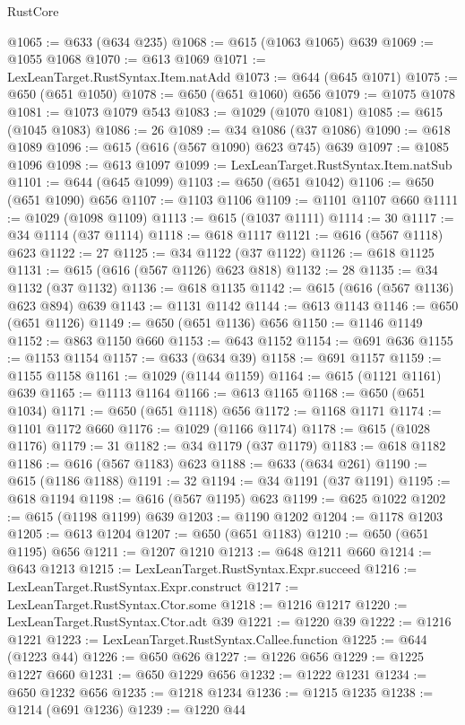 \begin{lexlean}{RustCore}
\begin{coremodule}
@1065 := @633 (@634 @235)
@1068 := @615 (@1063 @1065) @639
@1069 := @1055 @1068
@1070 := @613 @1069
@1071 := LexLeanTarget.RustSyntax.Item.natAdd
@1073 := @644 (@645 @1071)
@1075 := @650 (@651 @1050)
@1078 := @650 (@651 @1060) @656
@1079 := @1075 @1078
@1081 := @1073 @1079 @543
@1083 := @1029 (@1070 @1081)
@1085 := @615 (@1045 @1083)
@1086 := 26
@1089 := @34 @1086 (@37 @1086)
@1090 := @618 @1089
@1096 := @615 (@616 (@567 @1090) @623 @745) @639
@1097 := @1085 @1096
@1098 := @613 @1097
@1099 := LexLeanTarget.RustSyntax.Item.natSub
@1101 := @644 (@645 @1099)
@1103 := @650 (@651 @1042)
@1106 := @650 (@651 @1090) @656
@1107 := @1103 @1106
@1109 := @1101 @1107 @660
@1111 := @1029 (@1098 @1109)
@1113 := @615 (@1037 @1111)
@1114 := 30
@1117 := @34 @1114 (@37 @1114)
@1118 := @618 @1117
@1121 := @616 (@567 @1118) @623
@1122 := 27
@1125 := @34 @1122 (@37 @1122)
@1126 := @618 @1125
@1131 := @615 (@616 (@567 @1126) @623 @818)
@1132 := 28
@1135 := @34 @1132 (@37 @1132)
@1136 := @618 @1135
@1142 := @615 (@616 (@567 @1136) @623 @894) @639
@1143 := @1131 @1142
@1144 := @613 @1143
@1146 := @650 (@651 @1126)
@1149 := @650 (@651 @1136) @656
@1150 := @1146 @1149
@1152 := @863 @1150 @660
@1153 := @643 @1152
@1154 := @691 @636
@1155 := @1153 @1154
@1157 := @633 (@634 @39)
@1158 := @691 @1157
@1159 := @1155 @1158
@1161 := @1029 (@1144 @1159)
@1164 := @615 (@1121 @1161) @639
@1165 := @1113 @1164
@1166 := @613 @1165
@1168 := @650 (@651 @1034)
@1171 := @650 (@651 @1118) @656
@1172 := @1168 @1171
@1174 := @1101 @1172 @660
@1176 := @1029 (@1166 @1174)
@1178 := @615 (@1028 @1176)
@1179 := 31
@1182 := @34 @1179 (@37 @1179)
@1183 := @618 @1182
@1186 := @616 (@567 @1183) @623
@1188 := @633 (@634 @261)
@1190 := @615 (@1186 @1188)
@1191 := 32
@1194 := @34 @1191 (@37 @1191)
@1195 := @618 @1194
@1198 := @616 (@567 @1195) @623
@1199 := @625 @1022
@1202 := @615 (@1198 @1199) @639
@1203 := @1190 @1202
@1204 := @1178 @1203
@1205 := @613 @1204
@1207 := @650 (@651 @1183)
@1210 := @650 (@651 @1195) @656
@1211 := @1207 @1210
@1213 := @648 @1211 @660
@1214 := @643 @1213
@1215 := LexLeanTarget.RustSyntax.Expr.succeed
@1216 := LexLeanTarget.RustSyntax.Expr.construct
@1217 := LexLeanTarget.RustSyntax.Ctor.some
@1218 := @1216 @1217
@1220 := LexLeanTarget.RustSyntax.Ctor.adt @39
@1221 := @1220 @39
@1222 := @1216 @1221
@1223 := LexLeanTarget.RustSyntax.Callee.function
@1225 := @644 (@1223 @44)
@1226 := @650 @626
@1227 := @1226 @656
@1229 := @1225 @1227 @660
@1231 := @650 @1229 @656
@1232 := @1222 @1231
@1234 := @650 @1232 @656
@1235 := @1218 @1234
@1236 := @1215 @1235
@1238 := @1214 (@691 @1236)
@1239 := @1220 @44

\end{coremodule}
\end{lexlean}

